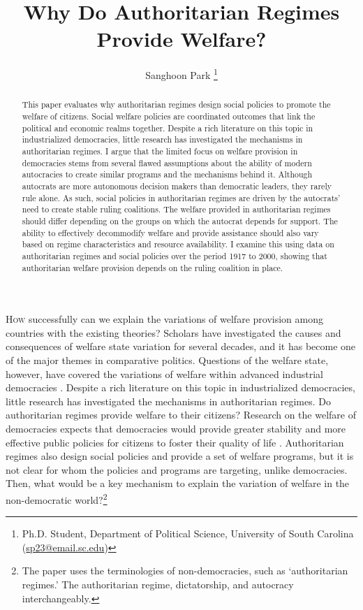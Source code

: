 \documentclass[11pt]{article}
\title{Why Do Authoritarian Regimes Provide Welfare?}
\author{Sanghoon Park
	\thanks{\small \small Ph.D. Student, Department of Political Science, University of South Carolina\\
		 \hspace*{1.8em}(\href{sp23@email.sc.edu}{sp23@email.sc.edu})}}
\begin{document}
\begin{titlingpage}
	\maketitle
	
\begin{abstract}
\onehalfspacing
\noindent This paper evaluates why authoritarian regimes design social policies to promote the welfare of citizens. Social welfare policies are coordinated outcomes that link the political and economic realms together. Despite a rich literature on this topic in industrialized democracies, little research has investigated the mechanisms in authoritarian regimes. I argue that the limited focus on welfare provision in democracies stems from several flawed assumptions about the ability of modern autocracies to create similar programs and the mechanisms behind it. Although autocrats are more autonomous decision makers than democratic leaders, they rarely rule alone. As such, social policies in authoritarian regimes are driven by the autocrats’ need to create stable ruling coalitions. The welfare provided in authoritarian regimes should differ depending on the groups on which the autocrat depends for support. The ability to effectively decommodify welfare and provide assistance should also vary based on regime characteristics and resource availability. I examine this using data on authoritarian regimes and social policies over the period 1917 to 2000, showing that authoritarian welfare provision depends on the ruling coalition in place.
\end{abstract}

\end{titlingpage}

\newpage

\noindent \lettrine{H}{ow} successfully can we explain the variations of welfare provision among countries with the existing theories? Scholars have investigated the causes and consequences of welfare state variation for several decades, and it has become one of the major themes in comparative politics. Questions of the welfare state, however, have covered the variations of welfare within advanced industrial democracies \citep{Pierson1996, Pierson2000}. Despite a rich literature on this topic in industrialized democracies, little research has investigated the mechanisms in authoritarian regimes. Do authoritarian regimes provide welfare to their citizens? Research on the welfare of democracies expects that democracies would provide greater stability and more effective public policies for citizens to foster their quality of life \citep{Gerring2012}. Authoritarian regimes also design social policies and provide a set of welfare programs, but it is not clear for whom the policies and programs are targeting, unlike democracies. Then, what would be a key mechanism to explain the variation of welfare in the non-democratic world?\footnote{The paper uses the terminologies of non-democracies, such as `authoritarian regimes.' The authoritarian regime, dictatorship, and autocracy interchangeably.}\par
\end{document}
